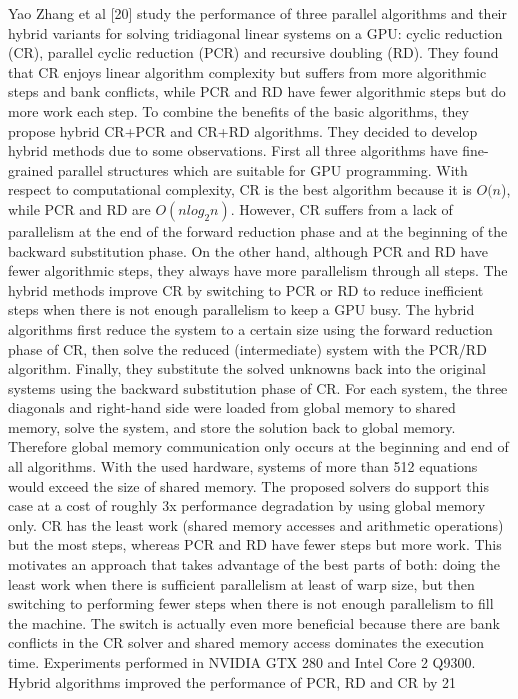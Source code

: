 Yao Zhang et al [20] study the performance of three parallel algorithms and their hybrid variants for solving tridiagonal linear systems on a GPU: cyclic reduction (CR), parallel cyclic reduction (PCR) and recursive doubling (RD). They found that CR enjoys linear algorithm complexity but suffers from more algorithmic steps and bank conflicts, while PCR and RD have fewer algorithmic steps but do more work each step. To combine the benefits of the basic algorithms, they propose hybrid CR+PCR and CR+RD algorithms. They decided to develop hybrid methods due to some observations. First all three algorithms have fine-grained parallel structures which are suitable for GPU programming. With respect to computational complexity, CR is the best algorithm because it is $O(n$), while PCR and RD are $O(nlog_2n)$. However, CR suffers from a lack of parallelism at the end of the forward reduction phase and at the beginning of the backward substitution phase. On the other hand, although PCR and RD have fewer algorithmic steps, they always have more parallelism through all steps. The hybrid methods improve CR by switching to PCR or RD to reduce inefficient steps when there is not enough parallelism to keep a GPU busy. The hybrid algorithms first reduce the system to a certain size using the forward reduction phase of CR, then solve the reduced (intermediate) system with the PCR/RD algorithm. Finally, they substitute the solved unknowns back into the original systems using the backward substitution phase of CR. For each system, the three diagonals and right-hand side were loaded from global memory to shared memory, solve the system, and store the solution back to global memory. Therefore global memory communication only occurs at the beginning and end of all algorithms. With the used hardware, systems of more than 512 equations would exceed the size of shared memory. The proposed solvers do support this case at a cost of roughly 3x performance degradation by using global memory only. CR has the least work (shared memory accesses and arithmetic operations) but the most steps, whereas PCR and RD have fewer steps but more work. This motivates an approach that takes advantage of the best parts of both: doing the least work when there is sufficient parallelism at least of warp size, but then switching to performing fewer steps when there is not enough parallelism to fill the machine. The switch is actually even more beneficial because there are bank conflicts in the CR solver and shared memory access dominates the execution time. Experiments performed in NVIDIA GTX 280 and Intel Core 2 Q9300. Hybrid algorithms improved the performance of PCR, RD and CR by 21%

